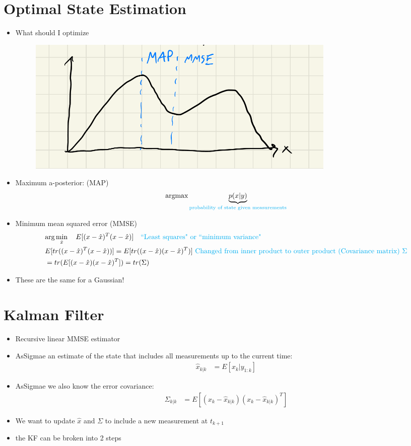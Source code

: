 \documentclass[11pt]{article}
\begin{document}
\section{Optimal State Estimation}
\begin{itemize}
    \item What should I optimize
    \begin{figure}[H]
        \centering
        \includegraphics[width=0.5\linewidth]{lecture_20_1.png}
    \end{figure}
    \item Maximum a-posterior: (MAP)
    \begin{align*}
        \text{argmax}  \underbrace{p(x|y)}_{\textcolor{cyan}{\text{probability of state given measurements}}}
    \end{align*}
    \item Minimum mean squared error (MMSE)
    \begin{align*}
        &\text{arg}\min_{\hat{x}}\quad E[(x-\hat{x})^T(x-\hat{x})] \quad\textcolor{cyan}{\text{``Least squares" or ``minimum variance"}}
        \\
        &E[tr((x-\hat{x})^T(x-\hat{x}))] = E[tr((x-\hat{x})(x-\hat{x})^T)]\textcolor{cyan}{\text{ Changed from inner product to outer product (Covariance matrix) }\Sigma}
        \\
        &= tr(E[(x-\hat{x})(x-\hat{x})^T]) = tr(\Sigma)
    \end{align*}
    \item These are the same for a Gaussian!
\end{itemize}

\section{Kalman Filter}
\begin{itemize}
    \item Recursive linear MMSE estimator
    \item AsSigmae an estimate of the state that includes all measurements up to the current time:
    \begin{align*}
        \hat{x}_{k|k} &= E[x_k|y_{1:k}]
    \end{align*}
    \item AsSigmae we also know the error covariance:
    \begin{align*}
        \Sigma_{k|k} &= E[(x_k-\hat{x}_{k|k})(x_k-\hat{x}_{k|k})^T]
    \end{align*}
    \item We want to update $\hat{x}$ and $\Sigma$ to include a new measurement at $t_{k+1}$
    \item the KF can be broken into 2 steps
\end{itemize}
\end{document}
